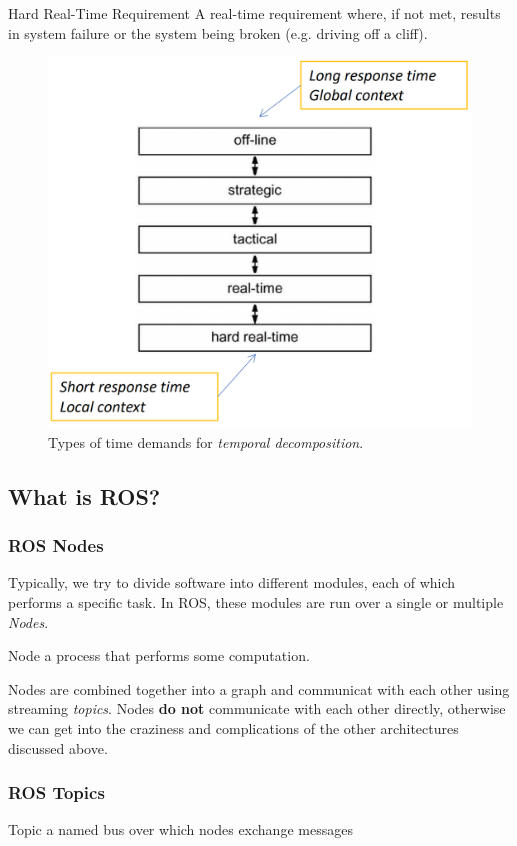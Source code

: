 \documentclass[13pt]{article}
\begin{document}
\begin{defn}{Hard Real-Time Requirement}
	A real-time requirement where, if not met, results in system failure or the system being broken (e.g. driving off a
	cliff).
\end{defn}

\begin{figure}
	\begin{center}
		\includegraphics[width=0.35\linewidth]{figures/temporal_decomp}
	\end{center}
	\caption{Types of time demands for \textit{temporal decomposition}.}
	\label{fig:temporal_decomp}
\end{figure}

\subsection{What is ROS?}%

\subsubsection{ROS Nodes}%

Typically, we try to divide software into different modules, each of which performs a specific task. In ROS, these
modules are run over a single or multiple \textit{Nodes}.

\begin{defn}{Node}
	a process that performs some computation.
\end{defn}

Nodes are combined together into a graph and communicat with each other using streaming \textit{topics}. Nodes
\textbf{do not} communicate with each other directly, otherwise we can get into the craziness and complications of the
other architectures discussed above.

\subsubsection{ROS Topics}%

\begin{defn}{Topic}
	a named bus over which nodes exchange messages
\end{defn}
\end{document}
